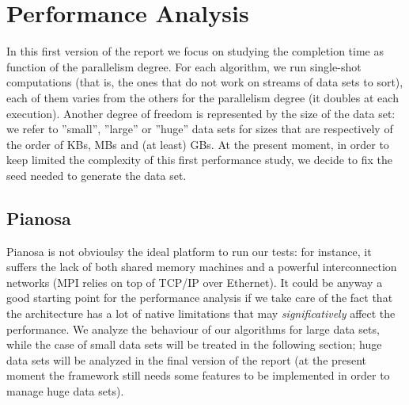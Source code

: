 \section{Performance Analysis}
In this first version of the report we focus on studying the completion time as function of the parallelism degree. For each algorithm, we run single-shot computations (that is, the ones that do not work on streams of data sets to sort), each of them varies from the others for the parallelism degree (it doubles at each execution). Another degree of freedom is represented by the size of the data set: we refer to ''small'', ''large'' or ''huge'' data sets for sizes that are respectively of the order of KBs, MBs and (at least) GBs. At the present moment, in order to keep limited the complexity of this first performance study, we decide to fix the seed needed to generate the data set.

\subsection{Pianosa}
Pianosa is not obvioulsy the ideal platform to run our tests: for instance, it suffers the lack of both shared memory machines and a powerful interconnection networks (MPI relies on top of TCP/IP over Ethernet). It could be anyway a good starting point for the performance analysis if we take care of the fact that the architecture has a lot of native limitations that may \textit{significatively} affect the performance. We analyze the behaviour of our algorithms for large data sets, while the case of small data sets will be treated in the following section; huge data sets will be analyzed in the final version of the report (at the present moment the framework still needs some features to be implemented in order to manage huge data sets).


